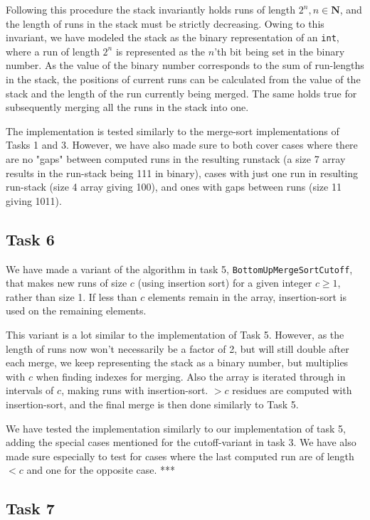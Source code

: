 \documentclass[11pt, a4paper]{article}
\begin{document}
Following this procedure the stack invariantly holds runs of length $2^n, n\in \mathbf{N}$, and the length of runs in the stack must be strictly decreasing. Owing to this invariant, we have modeled the stack as the binary representation of an \verb|int|, where a run of length $2^n$ is represented as the $n$'th bit being set in the binary number. As the value of the binary number corresponds to the sum of run-lengths in the stack, the positions of current runs can be calculated from the value of the stack and the length of the run currently being merged. The same holds true for subsequently merging all the runs in the stack into one. 

The implementation is tested similarly to the merge-sort implementations of Tasks 1 and 3. However, we have also made sure to both cover cases where there are no "gaps" between computed runs in the resulting runstack (a size 7 array results in the run-stack being 111 in binary), cases with just one run in resulting run-stack (size 4 array giving 100), and ones with gaps between runs (size 11 giving 1011).

\subsection{Task 6}

We have made a variant of the algorithm in task 5, \verb|BottomUpMergeSortCutoff|, that makes new runs of size $c$ (using insertion sort) for a given integer $c\geq1$, rather than size 1. If less than $c$ elements remain in the array, insertion-sort is used on the remaining elements. 

This variant is a lot similar to the implementation of Task 5. However, as the length of runs now won't necessarily be a factor of 2, but will still double after each merge, we keep representing the stack as a binary number, but multiplies with $c$ when finding indexes for merging. Also the array is iterated through in intervals of $c$, making runs with insertion-sort. $>c$ residues are computed with insertion-sort, and the final merge is then done similarly to Task 5.

We have tested the implementation similarly to our implementation of task 5, adding the special cases mentioned for the cutoff-variant in task 3. We have also made sure especially to test for cases where the last computed run are of length $<c$ and one for the opposite case. ***

\subsection{Task 7}
\end{document}
